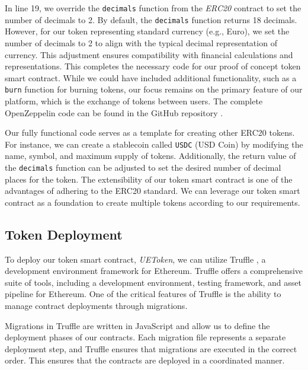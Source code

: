 In line 19, we override the \texttt{decimals} function from the \textit{ERC20} contract to set the number of decimals to 2. By default, the \texttt{decimals} function returns 18 decimals. However, for our token representing standard currency (e.g., Euro), we set the number of decimals to 2 to align with the typical decimal representation of currency. This adjustment ensures compatibility with financial calculations and representations. This completes the necessary code for our proof of concept token smart contract. While we could have included additional functionality, such as a \texttt{burn} function for burning tokens, our focus remains on the primary feature of our platform, which is the exchange of tokens between users. The complete OpenZeppelin code can be found in the GitHub repository \cite{openzeppelin_github}.

Our fully functional code serves as a template for creating other ERC20 tokens. For instance, we can create a stablecoin called \texttt{USDC} (USD Coin) by modifying the name, symbol, and maximum supply of tokens. Additionally, the return value of the \texttt{decimals} function can be adjusted to set the desired number of decimal places for the token. The extensibility of our token smart contract is one of the advantages of adhering to the ERC20 standard. We can leverage our token smart contract as a foundation to create multiple tokens according to our requirements.



\subsection{Token Deployment}
\label{subsec:token_deployment}

To deploy our token smart contract, \textit{UEToken}, we can utilize Truffle \cite{truffle}, a development environment framework for Ethereum. Truffle offers a comprehensive suite of tools, including a development environment, testing framework, and asset pipeline for Ethereum. One of the critical features of Truffle is the ability to manage contract deployments through migrations.

Migrations in Truffle are written in JavaScript and allow us to define the deployment phases of our contracts. Each migration file represents a separate deployment step, and Truffle ensures that migrations are executed in the correct order. This ensures that the contracts are deployed in a coordinated manner.

